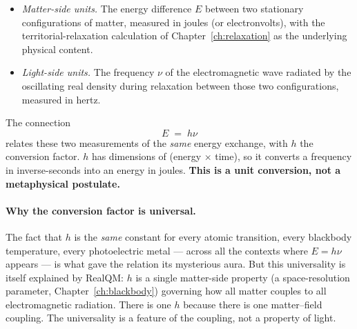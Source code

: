 \begin{itemize}
\item \emph{Matter-side units.} The energy difference $E$ between two stationary configurations of matter, measured in joules (or electronvolts), with the territorial-relaxation calculation of Chapter~\ref{ch:relaxation} as the underlying physical content.
\item \emph{Light-side units.} The frequency $\nu$ of the electromagnetic wave radiated by the oscillating real density during relaxation between those two configurations, measured in hertz.
\end{itemize}

The connection
\[
E \;=\; h\nu
\]
relates these two measurements of the \emph{same} energy exchange, with $h$ the conversion factor. $h$ has dimensions of (energy $\times$ time), so it converts a frequency in inverse-seconds into an energy in joules. \textbf{This is a unit conversion, not a metaphysical postulate.}

\paragraph{Why the conversion factor is universal.}
The fact that $h$ is the \emph{same} constant for every atomic transition, every blackbody temperature, every photoelectric metal --- across all the contexts where $E = h\nu$ appears --- is what gave the relation its mysterious aura. But this universality is itself explained by RealQM: $h$ is a single matter-side property (a space-resolution parameter, Chapter~\ref{ch:blackbody}) governing how all matter couples to all electromagnetic radiation. There is one $h$ because there is one matter--field coupling. The universality is a feature of the coupling, not a property of light.

